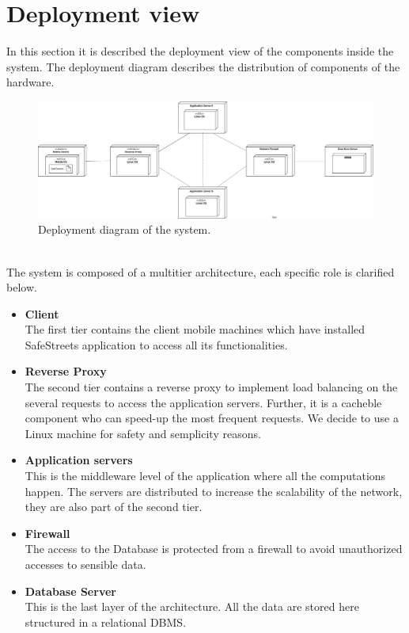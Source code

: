 \documentclass{report}
\begin{document}
\section{Deployment view}
In this section it is described the deployment view of the components inside the system.
The deployment diagram describes the distribution of components of the hardware.
\begin{figure}[!ht]
	\begin{center}
	\includegraphics[width=\textwidth]{img/DeploymentView.png}
    \end{center}
    \label{fig:deploymentview}
	\caption{Deployment diagram of the system.}
\end{figure}\\
The system is composed of a multitier architecture, each specific role is clarified below.\\
\begin{itemize}
    \item \textbf{Client}\\
    The first tier contains the client mobile machines which have installed SafeStreets application
    to access all its functionalities.\\
    \item \textbf{Reverse Proxy}\\
    The second tier contains a reverse proxy to implement load balancing on the several requests to access the application servers.
    Further, it is a cacheble component who can speed-up the most frequent requests.
    We decide to use a Linux machine for safety and semplicity reasons. \\
    \item \textbf{Application servers}\\
    This is the middleware level of the application where all the computations happen. The servers
    are distributed to increase the scalability of the network, they are also part of the second tier.\\
    \item \textbf{Firewall}\\
    The access to the Database is protected from a firewall to avoid unauthorized accesses to sensible data.\\
    \item \textbf{Database Server}\\
    This is the last layer of the architecture. All the data are stored here structured in a relational DBMS.
\end{itemize}
\end{document}
